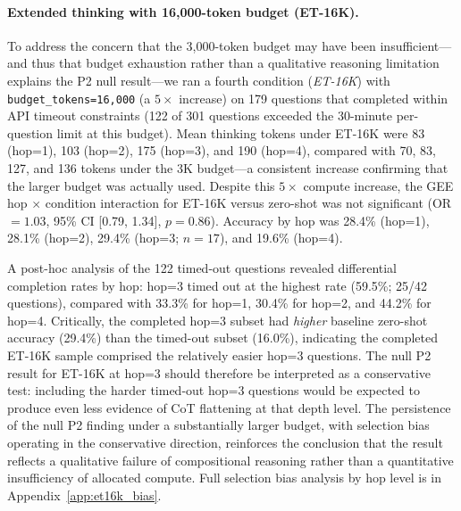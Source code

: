 \documentclass{article}
\begin{document}
\paragraph{Extended thinking with 16,000-token budget (ET-16K).}
To address the concern that the 3,000-token budget may have been insufficient---
and thus that budget exhaustion rather than a qualitative reasoning limitation
explains the P2 null result---we ran a fourth condition (\textit{ET-16K}) with
\texttt{budget\_tokens=16{,}000} (a $5\times$ increase) on 179 questions that
completed within API timeout constraints (122 of 301 questions exceeded the
30-minute per-question limit at this budget).  Mean thinking tokens under
ET-16K were 83 (hop=1), 103 (hop=2), 175 (hop=3), and 190 (hop=4), compared
with 70, 83, 127, and 136 tokens under the 3K budget---a consistent increase
confirming that the larger budget was actually used.  Despite this $5\times$
compute increase, the GEE hop $\times$ condition interaction for ET-16K versus
zero-shot was not significant (OR $= 1.03$, 95\% CI [0.79, 1.34], $p = 0.86$).
Accuracy by hop was 28.4\% (hop=1), 28.1\% (hop=2), 29.4\% (hop=3;
$n = 17$), and 19.6\% (hop=4).

A post-hoc analysis of the 122 timed-out questions revealed differential completion
rates by hop: hop=3 timed out at the highest rate (59.5\%; 25/42 questions),
compared with 33.3\% for hop=1, 30.4\% for hop=2, and 44.2\% for hop=4.
Critically, the completed hop=3 subset had \emph{higher} baseline zero-shot accuracy
(29.4\%) than the timed-out subset (16.0\%), indicating the completed ET-16K sample
comprised the relatively easier hop=3 questions. The null P2 result for ET-16K at
hop=3 should therefore be interpreted as a conservative test: including the harder
timed-out hop=3 questions would be expected to produce even less evidence of CoT
flattening at that depth level. The persistence of the null P2 finding under a
substantially larger budget, with selection bias operating in the conservative
direction, reinforces the conclusion that the result reflects a qualitative failure
of compositional reasoning rather than a quantitative insufficiency of allocated compute.
Full selection bias analysis by hop level is in Appendix~\ref{app:et16k_bias}.
\end{document}
